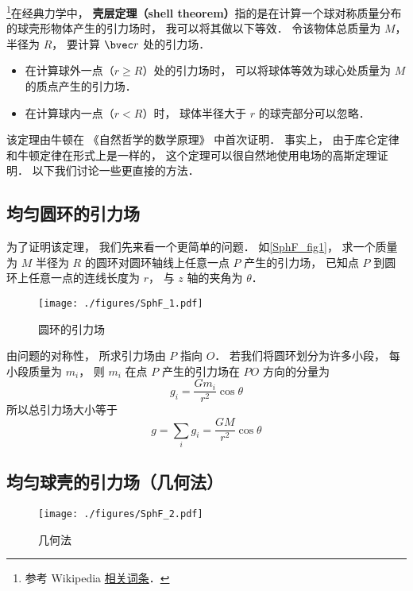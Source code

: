 

\footnote{参考 Wikipedia \href{https://en.wikipedia.org/wiki/Shell_theorem}{相关词条}．}在经典力学中， \textbf{壳层定理（shell theorem）}指的是在计算一个球对称质量分布的球壳形物体产生的引力场时， 我可以将其做以下等效． 令该物体总质量为 $M$， 半径为 $R$， 要计算 $\bvec r$ 处的引力场．
\begin{itemize}
\item 在计算球外一点（$r \geqslant R$）处的引力场时， 可以将球体等效为球心处质量为 $M$ 的质点产生的引力场．
\item 在计算球内一点（$r < R$）时， 球体半径大于 $r$ 的球壳部分可以忽略．
\end{itemize}

该定理由牛顿在 《自然哲学的数学原理》 中首次证明． 事实上， 由于库仑定律和牛顿定律在形式上是一样的， 这个定理可以很自然地使用电场的高斯定理证明． 以下我们讨论一些更直接的方法．

\subsection{均匀圆环的引力场}
为了证明该定理， 我们先来看一个更简单的问题． 如\autoref{SphF_fig1}， 求一个质量为 $M$ 半径为 $R$ 的圆环对圆环轴线上任意一点 $P$ 产生的引力场， 已知点 $P$ 到圆环上任意一点的连线长度为 $r$， 与 $z$ 轴的夹角为 $\theta$．

\begin{figure}[ht]
\centering
\texttt{[image: ./figures/SphF\_1.pdf]}
\caption{圆环的引力场} \label{SphF_fig1}
\end{figure}

由问题的对称性， 所求引力场由 $P$ 指向 $O$． 若我们将圆环划分为许多小段， 每小段质量为 $m_i$， 则 $m_i$ 在点 $P$ 产生的引力场在 $PO$ 方向的分量为
\begin{equation}
g_i = \frac{Gm_i}{r^2}\cos\theta
\end{equation}
所以总引力场大小等于
\begin{equation}\label{SphF_eq2}
g = \sum_i g_i = \frac{GM}{r^2}\cos\theta
\end{equation}

\subsection{均匀球壳的引力场（几何法）}

\begin{figure}[ht]
\centering
\texttt{[image: ./figures/SphF\_2.pdf]}
\caption{几何法} \label{SphF_fig2}
\end{figure}

